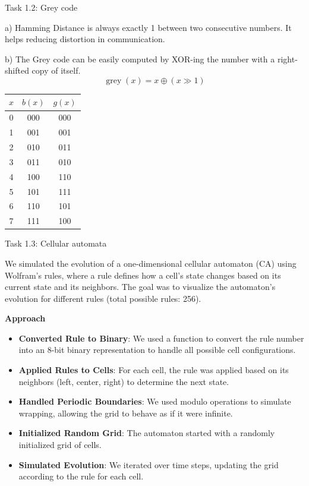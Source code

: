 \documentclass[aspectratio=169]{beamer}
\begin{document}
\begin{frame}{Task 1.2: Grey code}
    \noindent
    \begin{minipage}[c]{0.7\linewidth}
        a) Hamming Distance is always exactly 1 between two consecutive numbers. It helps reducing distortion in communication.
        \vspace{1em}

        b) The Grey code can be easily computed by XOR-ing the number with a right-shifted copy of itself.
        \[\operatorname{grey}(x) = x \oplus (x \gg 1)\]
    \end{minipage}\hfill
    \begin{minipage}[t]{0.25\linewidth}
        \begin{tabular}{c|c|c}
            $x$ & $b(x)$ & $g(x)$ \\\hline
            0 & 000 & 000 \\
            1 & 001 & 001 \\
            2 & 010 & 011 \\
            3 & 011 & 010 \\
            4 & 100 & 110 \\
            5 & 101 & 111 \\
            6 & 110 & 101 \\
            7 & 111 & 100 \\
        \end{tabular}
    \end{minipage}
\end{frame}


\begin{frame}{Task 1.3: Cellular automata}

We simulated the evolution of a one-dimensional cellular automaton (CA) using Wolfram's rules, where a rule defines how a cell's state changes based on its current state and its neighbors. The goal was to visualize the automaton’s evolution for different rules (total possible rules: 256).

\vspace{1em}
\textbf{Approach}
\vspace{1em}
{\footnotesize
\begin{itemize}
    \item \textbf{Converted Rule to Binary}: We used a function to convert the rule number into an 8-bit binary representation to handle all possible cell configurations.
    \item \textbf{Applied Rules to Cells}: For each cell, the rule was applied based on its neighbors (left, center, right) to determine the next state.
    \item \textbf{Handled Periodic Boundaries}: We used modulo operations to simulate wrapping, allowing the grid to behave as if it were infinite.
    \item \textbf{Initialized Random Grid}: The automaton started with a randomly initialized grid of cells.
    \item \textbf{Simulated Evolution}: We iterated over time steps, updating the grid according to the rule for each cell.
\end{itemize}
}
\end{frame}
\end{document}
